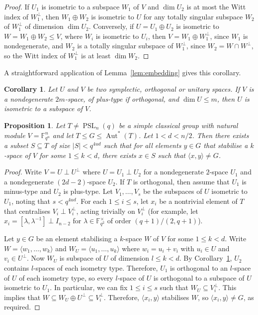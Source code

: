 \documentclass[11pt]{article}
\numberwithin{equation}{section}
\theoremstyle{shdefinition}
\theoremstyle{shplain}
\newtheorem{corollary}[definition]{Corollary}
\newtheorem{proposition}[definition]{Proposition}
\renewcommand{\l}{\lambda}
\newcommand{\<}{\langle}
\renewcommand{\>}{\rangle}
\renewcommand{\leq}{\leqslant}
\newcommand{\Aut}{\operatorname{Aut}}
\newcommand{\F}{\mathbb{F}}
\renewcommand{\:}{\colon}
\newcommand{\PSL}{\operatorname{PSL}}
\begin{document}
\begin{proof}
If $U_1$ is isometric to a subspace $W_1$ of $V$ and $\dim{U_2}$ is at most the Witt index of $W_1^\perp$, then $W_1 \oplus W_2$ is isometric to $U$ for any totally singular subspace $W_2$ of $W_1^\perp$ of dimension $\dim{U_2}$. Conversely, if $U = U_1 \oplus U_2$ is isometric to $W = W_1 \oplus W_2 \leq V$,  where $W_i$ is isometric to $U_i$, then $V = W_1 \oplus W_1^{\perp}$, since $W_1$ is nondegenerate, and $W_2$ is a totally singular subspace of $W_1^\perp$, since $W_2 = W \cap W^\perp$, so the Witt index of $W_1^\perp$ is at least $\dim{W_2}$. 
\end{proof}

A straightforward application of Lemma~\ref{lem:embedding} gives this corollary. 

\begin{corollary} \label{cor:embedding}
Let $U$ and $V$ be two symplectic, orthogonal or unitary spaces. If $V$ is a nondegenerate $2m$-space, of plus-type if orthogonal, and $\dim{U} \leq m$, then $U$ is isometric to a subspace of $V$.
\end{corollary}

\begin{proposition} \label{prop:subspaces_spread}
Let $T \neq \PSL_n(q)$ be a simple classical group with natural module $V = \F_{q^u}^n$ and let $T \leq G \leq \Aut^*(T)$. Let $1 < d < n/2$. Then there exists a subset $S \subseteq T$ of size $|S| < q^{4ud}$ such that for all elements $y \in G$ that stabilise a $k$-space of $V$ for some $1 \leq k < d$, there exists $x \in S$ such that $\<x, y\> \neq G$. 
\end{proposition}

\begin{proof}
Write $V = U \perp U^\perp$ where $U = U_1 \perp U_2$ for a nondegenerate $2$-space $U_1$ and a nondegenerate $(2d-2)$-space $U_2$. If $T$ is orthogonal, then assume that $U_1$ is minus-type and $U_2$ is plus-type. Let $V_1,\dots,V_s$ be the subspaces of $U$ isometric to $U_1$, noting that $s < q^{4ud}$. For each $1 \leq i \leq s$, let $x_i$ be a nontrivial element of $T$ that centralises $V_i \perp V_i^\perp$, acting trivially on $V_i^\perp$ (for example, let $x_i = [\l,\l^{-1}] \perp I_{n-2}$ for $\l \in \F_{q^2}^\times$ of order $(q+1)/(2,q+1)$).

Let $y \in G$ be an element stabilising a $k$-space $W$ of $V$ for some $1 \leq k < d$. Write $W = \< w_1,\dots,w_k \>$ and $W_U = \< u_1, \dots, u_k \>$ where $w_i = u_i + v_i$ with $u_i \in U$ and $v_i \in U^\perp$. Now $W_U$ is subspace of $U$ of dimension $l \leq k < d$. By Corollary~\ref{cor:embedding}, $U_2$ contains $l$-spaces of each isometry type. Therefore, $U_1$ is orthogonal to an $l$-space of $U$ of each isometry type, so every $l$-space of $U$ is orthogonal to a subspace of $U$ isometric to $U_1$. In particular, we can fix $1 \leq i \leq s$ such that $W_U \subseteq V_i^\perp$. This implies that $W \subseteq W_U \oplus U^\perp \subseteq V_i^\perp$. Therefore, $\<x_i,y\>$ stabilises $W$, so $\<x_i,y\> \neq G$, as required.
\end{proof}
\end{document}
